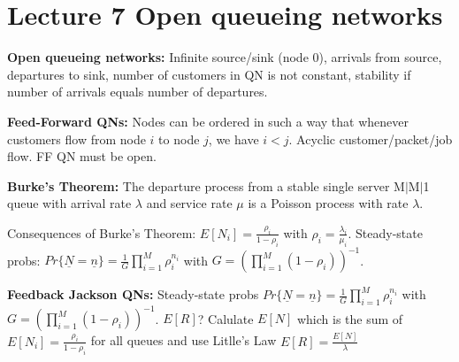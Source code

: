 \section{Lecture 7 Open queueing networks}
\textbf{Open queueing networks:} Infinite source/sink (node 0), arrivals from source,
departures to sink, number of customers in QN is not constant, stability if number of arrivals equals number of departures.

\textbf{Feed-Forward QNs:} Nodes can be ordered in such a way that whenever customers flow from node $i$ to node $j$, we have $i < j$. Acyclic customer/packet/job flow. FF QN must be open.

\textbf{Burke's Theorem:} The departure process from a stable single server M$|$M$|$1 queue with arrival rate $\lambda$ and service rate $\mu$ is a Poisson process with rate $\lambda$.

Consequences of Burke's Theorem: $E[N_{i}] = \frac{\rho_i}{1-\rho_i}$ with $\rho_i = \frac{\lambda_i}{\mu_{i}}$.
Steady-state probs: $Pr\{\underline{N} = \underline{n}\} = \frac{1}{G}\prod^{M}_{i=1}\rho_{i}^{n_{i}}$ with $G = (\prod^{M}_{i=1} (1-\rho_{i}))^{-1}$.


\textbf{Feedback Jackson QNs:} Steady-state probs $Pr\{\underline{N} = \underline{n}\} = \frac{1}{G}\prod^{M}_{i=1}\rho_{i}^{n_{i}}$ with $G = (\prod^{M}_{i=1} (1-\rho_{i}))^{-1}$.
$E[R]$? Calulate $E[N]$ which is the sum of $E[N_i] = \frac{\rho_i}{1-\rho_i}$ for all queues and use Litlle's Law $E[R] = \frac{E[N]}{\lambda}$


